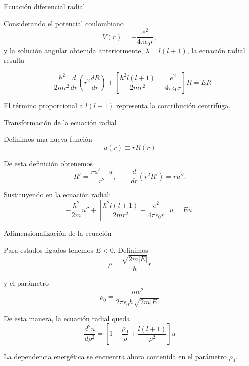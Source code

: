 \begin{frame}{Ecuación diferencial radial}

    Considerando el potencial coulombiano
    \[
        V(r)=-\frac{e^2}{4\pi\epsilon_0r},
    \]
    y la solución angular obtenida anteriormente,
    $\lambda=l(l+1)$, la ecuación radial resulta

    \begin{equation}
    -\frac{\hbar^2}{2mr^2}
    \frac{d}{dr}\left(r^2\frac{dR}{dr}\right)
    +
    \left[
        \frac{\hbar^2l(l+1)}{2mr^2}
        -\frac{e^2}{4\pi\epsilon_0r}
    \right]R=ER
    \label{eq:ec de schrodinger radial}
    \end{equation}


    El término proporcional a $l(l+1)$ representa
    la contribución centrífuga.

\end{frame}

\begin{frame}{Transformación de la ecuación radial}

    Definimos una nueva función
    \begin{equation}
        u(r)\equiv rR(r)
        \label{eq: definición u}
    \end{equation}
        

    De esta definición obtenemos
    \[
        R'=\frac{ru'-u}{r^2},
        \qquad
        \frac{d}{dr}(r^2R')=ru''.
    \]

    Sustituyendo en la ecuación radial:
    \[
    -\frac{\hbar^2}{2m}u''
    +
    \left[
        \frac{\hbar^2l(l+1)}{2mr^2}
        -\frac{e^2}{4\pi\epsilon_0r}
    \right]u=Eu.
    \]

\end{frame}

\begin{frame}{Adimensionalización de la ecuación}

    Para estados ligados tenemos $E<0$. Definimos
    \begin{equation}
        \rho=\frac{\sqrt{2m|E|}}{\hbar}r
    \end{equation}

    y el parámetro
    \begin{equation}
        \rho_0=\frac{me^2}{2\pi\epsilon_0\hbar\sqrt{2m|E|}}
    \end{equation}
 
    De esta manera, la ecuación radial queda
    \begin{equation}
        \frac{d^2u}{d\rho^2} =
        \left[
            1-\frac{\rho_0}{\rho}+\frac{l(l+1)}{\rho^2}
        \right]u
        \label{eq:edo radial adimensional}
    \end{equation}

    La dependencia energética se encuentra ahora contenida
    en el parámetro $\rho_0$.

\end{frame}

